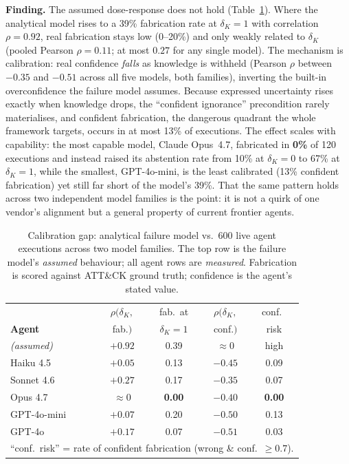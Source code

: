 \textbf{Finding.} The assumed dose-response does not hold
(Table~\ref{tab:calib_mag}). Where the analytical model rises to a
39\% fabrication rate at $\delta_K = 1$ with correlation $\rho = 0.92$,
real fabrication stays low (0--20\%) and only weakly related to $\delta_K$
(pooled Pearson $\rho = 0.11$; at most $0.27$ for any single model). The mechanism is calibration: real
confidence \textit{falls} as knowledge is withheld (Pearson $\rho$
between $-0.35$ and $-0.51$ across all five models, both families),
inverting the built-in overconfidence the failure model assumes.
Because expressed uncertainty rises exactly when knowledge drops, the
``confident ignorance'' precondition rarely materialises, and confident
fabrication, the dangerous quadrant the whole framework targets, occurs
in at most 13\% of executions. The effect scales with capability: the
most capable model, Claude Opus~4.7, fabricated in \textbf{0\%} of 120
executions and instead raised its abstention rate from 10\% at
$\delta_K = 0$ to 67\% at $\delta_K = 1$, while the smallest,
GPT-4o-mini, is the least calibrated (13\% confident fabrication) yet
still far short of the model's 39\%. That the same pattern holds across
two independent model families is the point: it is not a quirk of one
vendor's alignment but a general property of current frontier agents.

\begin{table}[t]
\caption{Calibration gap: analytical failure model vs.\ 600 live agent
executions across two model families. The top row is the failure model's
\emph{assumed} behaviour; all agent rows are \emph{measured}. Fabrication is
scored against ATT\&CK ground truth; confidence is the agent's stated value.}
\label{tab:calib_mag}
\centering
\footnotesize
\setlength{\tabcolsep}{3.5pt}
\begin{tabular}{lcccc}
\toprule
 & $\rho(\delta_K,$ & fab.\ at & $\rho(\delta_K,$ & conf.\ \\
\textbf{Agent} & fab.$)$ & $\delta_K{=}1$ & conf.$)$ & risk \\
\midrule
\SAFK{} \emph{(assumed)} & $+0.92$ & 0.39 & $\approx 0$ & high \\
\midrule
Haiku 4.5          & $+0.05$ & 0.13 & $-0.45$ & 0.09 \\
Sonnet 4.6         & $+0.27$ & 0.17 & $-0.35$ & 0.07 \\
Opus 4.7           & $\approx 0$ & \textbf{0.00} & $-0.40$ & \textbf{0.00} \\
GPT-4o-mini        & $+0.07$ & 0.20 & $-0.50$ & 0.13 \\
GPT-4o             & $+0.17$ & 0.07 & $-0.51$ & 0.03 \\
\bottomrule
\multicolumn{5}{l}{\footnotesize ``conf.\ risk'' = rate of confident
fabrication (wrong \& conf.\ $\geq 0.7$).}
\end{tabular}
\end{table}

